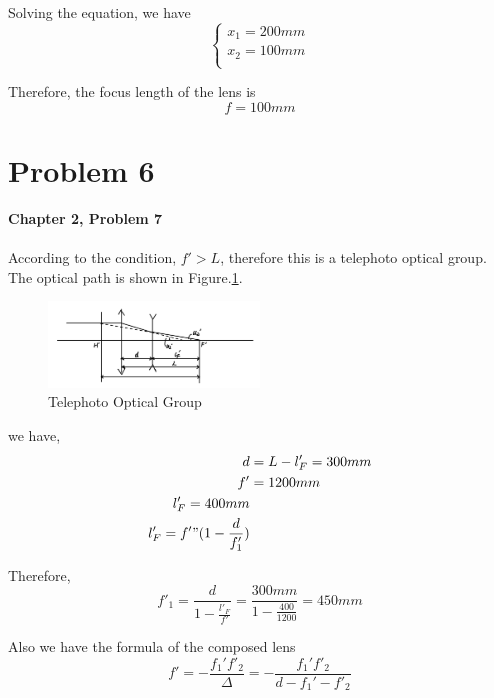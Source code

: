 \documentclass{article}
\begin{document}
Solving the equation, we have
\begin{equation}
    \begin{cases}
        x_1 = 200mm \\
        x_2 = 100mm \\
    \end{cases}
\end{equation}

Therefore, the focus length of the lens is
\begin{equation}
    \boxed{
        f=100mm
    }
\end{equation}

\section{Problem 6}
\textbf{Chapter 2, Problem 7}\\\\

According to the condition, $f'>L$, therefore this is a telephoto optical group. The optical path is shown in Figure.\ref{fig:telephoto_optical_group}.
\begin{figure}[H]
    \centering
    \includegraphics[width=0.5\textwidth]{image/hw2/hw2_3_1.jpeg}
    \caption{Telephoto Optical Group}
    \label{fig:telephoto_optical_group}
\end{figure}

we have,
\begin{align}
    d  & =  L-l'_F = 300mm \\
    f' & = 1200mm          \\
    l'_F = 400mm           \\
    l'_F = f'"(1-\frac{d}{f_1'})
\end{align}

Therefore,
\begin{equation}
    \boxed{
        f'_1 = \frac{d}{1-\frac{l'_F}{f'}} = \frac{300mm}{1-\frac{400}{1200}} = 450mm
    }
\end{equation}

Also we have the formula of the composed lens
\begin{equation}
    f' = -\frac{f_1'f'_2}{\Delta} = -\frac{f_1'f'_2}{d-f_1'-f'_2}
\end{equation}
\end{document}

